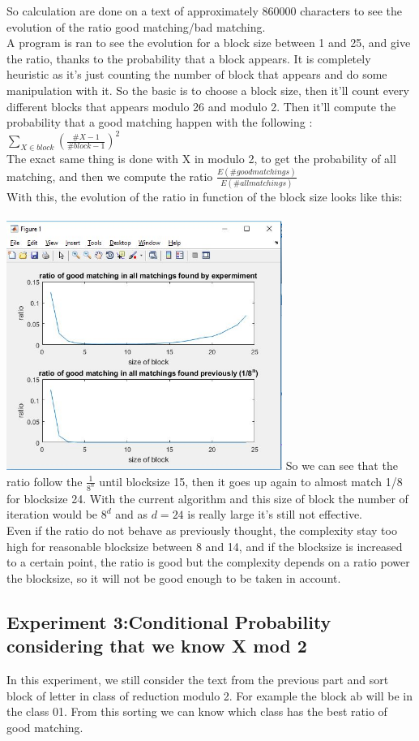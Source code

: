 \documentclass{article}
\begin{document}
So calculation are done on a text of approximately $860000$ characters to see the evolution of the ratio good matching/bad matching.\\
A program is ran to see the evolution for a block size between 1 and 25, and give the ratio, thanks to the probability that a block appears. It is completely heuristic as it's just counting the number of block that appears and do some manipulation with it.
So the basic is to choose a block size, then it'll count every different blocks that appears modulo 26 and modulo 2.
Then it'll compute the probability that a good matching happen with the following : $\sum_{X \in block}({\frac{\#X -1}{\#block -1}})^2 $\\
The exact same thing is done with X in modulo 2, to get the probability of all matching, and then we compute the ratio $\frac{E(\# good matchings)}{E(\# all matchings)}$\\
With this, the evolution of the ratio in function of the block size looks like this:\\
\\
\includegraphics[width=90mm]{ratio.jpg}
So we can see that the ratio follow the $\frac{1}{8^n}$ until blocksize 15, then it goes up again to almost match 1/8 for blocksize 24. With the current algorithm and this size of block the number of iteration would be $8^d$ and as $d = 24$ is really large it's still not effective.\\
Even if the ratio do not behave as previously thought, the complexity stay too high for reasonable blocksize between 8 and 14, and if the blocksize is increased to a certain point, the ratio is good but the complexity depends on a ratio power the blocksize, so it will not be good enough to be taken in account.

\subsection{Experiment 3:Conditional Probability considering that we know X mod 2}
In this experiment, we still consider the text from the previous part and sort block of letter in class of reduction modulo 2.
For example the block ab will be in the class 01. From this sorting we can know which class has the best ratio of good matching.
\end{document}
